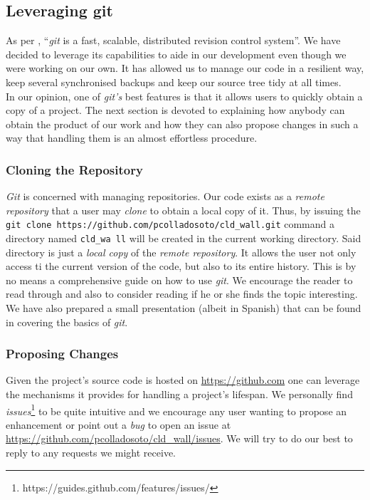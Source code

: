         \subsection{Leveraging git}
            As per \cite{bib:man-git}, ``\textit{git} is a fast, scalable, distributed revision control system''. We have decided to leverage its capabilities to aide in our development even though we were working on our own. It has allowed us to manage our code in a resilient way, keep several synchronised backups and keep our source tree tidy at all times.\\

            In our opinion, one of \textit{git's} best features is that it allows users to quickly obtain a copy of a project. The next section is devoted to explaining how anybody can obtain the product of our work and how they can also propose changes in such a way that handling them is an almost effortless procedure.\\

            \subsubsection{Cloning the Repository}
                \textit{Git} is concerned with managing repositories. Our code exists as a \textit{remote repository} that a user may \textit{clone} to obtain a local copy of it. Thus, by issuing the \texttt{git clone https://github.com/pcolladosoto/cld\_wall.git} command a directory named \texttt{cld\_wa ll} will be created in the current working directory. Said directory is just a \textit{local copy} of the \textit{remote repository}. It allows the user not only access ti the current version of the code, but also to its entire history. This is by no means a comprehensive guide on how to use \textit{git}. We encourage the reader to read through \cite{bib:man-git} and also to consider reading \cite{bib:pro-git} if he or she finds the topic interesting. We have also prepared a small presentation (albeit in Spanish) that can be found in \cite{bib:git-talk} covering the basics of \textit{git}.\\

            \subsubsection{Proposing Changes}
                Given the project's source code is hosted on \url{https://github.com} one can leverage the mechanisms it provides for handling a project's lifespan. We personally find \textit{issues}\footnote{https://guides.github.com/features/issues/} to be quite intuitive and we encourage any user wanting to propose an enhancement or point out a \textit{bug} to open an issue at \url{https://github.com/pcolladosoto/cld\_wall/issues}. We will try to do our best to reply to any requests we might receive.\\

